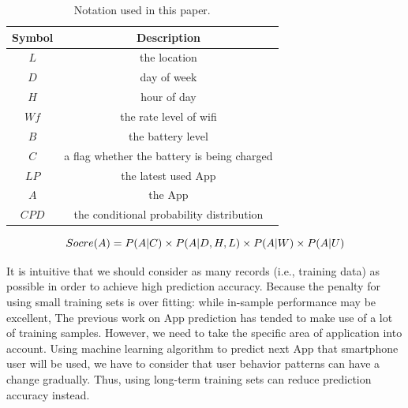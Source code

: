 \begin{table}[t]
\setlength{\tabcolsep}{1.2em}
\scriptsize
  \centering
  \caption{Notation used in this paper.}
  \begin{tabular}{c|c}
     \hline
     Symbol & Description \\
     \hline
     \hline
     $L$ & the location  \\
     $D$ & day of week  \\
     $H$ & hour of day  \\
     $Wf$ & the rate level of wifi  \\
     $B$ & the battery level  \\
     $C$ & a flag whether the battery is being charged  \\
     $LP$ & the latest used App  \\
     $A$ & the App   \\
     $CPD$ & the conditional probability distribution  \\
     \hline
   \end{tabular}
 \label{tbl: acronym}
 \vspace{-0.1in}
\end{table}


\begin{equation}
\footnotesize
\label{eq: prediction}
    Socre(A) = P(A | C) \times P(A|D,H,L) \times P(A|W) \times P(A|U)
\end{equation}


 It is intuitive that we should consider as many records (i.e., training data) as possible in order to achieve high prediction accuracy. Because the penalty for using small training sets is over fitting: while in-sample performance may be excellent, The previous work on App prediction has tended to make use of a lot of training samples. However, we need to take the specific area of application into account. Using machine learning algorithm to predict next App that smartphone user will be used, we have to consider that user behavior patterns can have a change gradually. Thus, using long-term training sets can reduce prediction accuracy instead.


